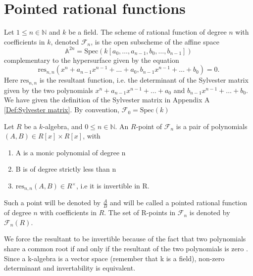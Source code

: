 \section{Pointed rational functions}
%
%
\begin{definition}\label{Def:Scheme of rational functions}
Let \(1 \leq n \in \mathbb{N}\) and \(k\) be a field. The scheme of rational function of degree \(n\) with coefficients in \(k\), denoted \(\mathcal{F}_n\), is the open subscheme of the affine space
%
\begin{equation*}
    \mathbb{A}^{2n} = \text{Spec}(k[a_0,\dots,a_{n-1},b_0,\dots, b_{n-1}])
\end{equation*} complementary to the hypersurface given by the equation 
%
\begin{equation*}
    \text{res}_{n,n}(x^n+a_{n-1}x^{n-1}+\dots+a_0, b_{n-1}x^{n-1}+\dots+b_0) = 0.
\end{equation*}
%
Here \(\text{res}_{n,n}\) is the resultant function, i.e. the determinant of the Sylvester matrix given by the two polynomials \(x^n+a_{n-1}x^{n-1}+\dots+a_0 \) and \(b_{n-1}x^{n-1}+\dots+b_0\). We have given the definition of the Sylvester matrix in Appendix A \ref{Def:Sylvester matrix}. By convention, \(\mathcal{F}_0=\text{Spec}(k)\)
%
\end{definition}
%
\begin{definition}\label{Def:R-point}
%
Let \(R\) be a \(k\)-algebra, and \(0 \leq n \in \mathbb{N}\). An \(R\)-point of \(\mathcal{F}_n\) is a pair of polynomials \((A,B) \in R[x]\times R[x]\), with
%
\begin{enumerate}
    \item A is a monic polynomial of degree n
    \item B is of degree strictly less than n
    \item \(\text{res}_{n,n}(A,B) \in R^{\times}\), i.e it is invertible in R. 
\end{enumerate}
%
Such a point will be denoted by \(\frac{A}{B}\) and will be called a pointed rational function of degree \(n\) with coefficients in \(R\). The set of R-points in \(\mathcal{F}_n\) is denoted by \(\mathcal{F}_n(R)\).
%
\end{definition}
%
\begin{remark}\label{rm:invertability}
%
We force the resultant to be invertible because of the fact that two polynomials share a common root if and only if the resultant of the two polynomials is zero \cite[Corollary 1.8]{Janson}. Since a k-algebra is a vector space (remember that k is a field), non-zero determinant and invertability is equivalent. 
%
\end{remark}
